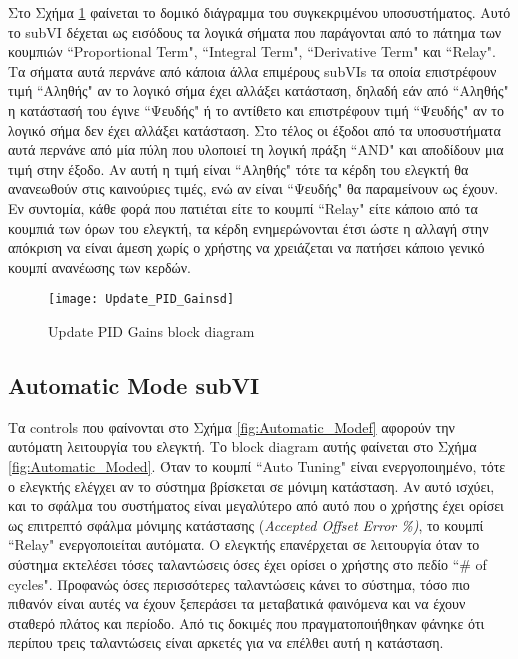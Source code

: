 Στο Σχήμα \ref{fig:Update_PID_Gainsd} φαίνεται το δομικό διάγραμμα του συγκεκριμένου υποσυστήματος. Αυτό το subVI δέχεται ως εισόδους τα λογικά σήματα που παράγονται από το πάτημα των κουμπιών ``Proportional Term", ``Integral Term", ``Derivative Term" και ``Relay". Τα σήματα αυτά περνάνε από κάποια άλλα επιμέρους subVIs τα οποία επιστρέφουν τιμή ``Αληθής" αν το λογικό σήμα έχει αλλάξει κατάσταση, δηλαδή εάν από ``Αληθής" η κατάστασή του έγινε ``Ψευδής" ή το αντίθετο και επιστρέφουν τιμή ``Ψευδής" αν το λογικό σήμα δεν έχει αλλάξει κατάσταση. Στο τέλος οι έξοδοι από τα υποσυστήματα αυτά περνάνε από μία πύλη που υλοποιεί τη λογική πράξη ``AND" και αποδίδουν μια τιμή στην έξοδο. Αν αυτή η τιμή είναι ``Αληθής" τότε τα κέρδη του ελεγκτή θα ανανεωθούν στις καινούριες τιμές, ενώ αν είναι ``Ψευδής" θα παραμείνουν ως έχουν. Εν συντομία, κάθε φορά που πατιέται είτε το κουμπί ``Relay" είτε κάποιο από τα κουμπιά των όρων του ελεγκτή, τα κέρδη ενημερώνονται έτσι ώστε η αλλαγή στην απόκριση να είναι άμεση χωρίς ο χρήστης να χρειάζεται να πατήσει κάποιο γενικό κουμπί ανανέωσης των κερδών.

\begin{figure}[h!]
  \centering
  \texttt{[image: Update\_PID\_Gainsd]}
  \caption{Update PID Gains block diagram}
  \label{fig:Update_PID_Gainsd}
\end{figure}

\subsection{Automatic Mode subVI}

Τα controls που φαίνονται στο Σχήμα \ref{fig:Automatic_Modef} αφορούν την αυτόματη λειτουργία του ελεγκτή. Το block diagram αυτής φαίνεται στο Σχήμα \ref{fig:Automatic_Moded}. Όταν το κουμπί ``Auto Tuning" είναι ενεργοποιημένο, τότε ο ελεγκτής ελέγχει αν το σύστημα βρίσκεται σε μόνιμη κατάσταση. Αν αυτό ισχύει, και το σφάλμα του συστήματος είναι μεγαλύτερο από αυτό που ο χρήστης έχει ορίσει ως επιτρεπτό σφάλμα μόνιμης κατάστασης (\emph{Accepted Offset Error \%)}, το κουμπί ``Relay" ενεργοποιείται αυτόματα. Ο ελεγκτής επανέρχεται σε λειτουργία όταν το σύστημα εκτελέσει τόσες ταλαντώσεις όσες έχει ορίσει ο χρήστης στο πεδίο ``\# of cycles". Προφανώς όσες περισσότερες ταλαντώσεις κάνει το σύστημα, τόσο πιο πιθανόν είναι αυτές να έχουν ξεπεράσει τα μεταβατικά φαινόμενα και να έχουν σταθερό πλάτος και περίοδο. Από τις δοκιμές που πραγματοποιήθηκαν φάνηκε ότι περίπου τρεις ταλαντώσεις είναι αρκετές για να επέλθει αυτή η κατάσταση.

